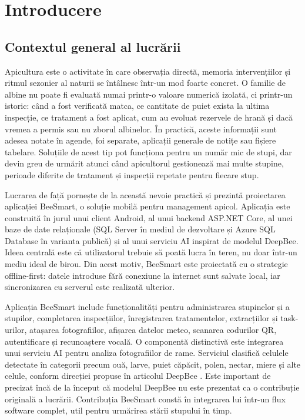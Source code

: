 \chapter{Introducere}
\label{chap:introducere}

\section{Contextul general al lucrării}

Apicultura este o activitate în care observația directă, memoria intervențiilor și ritmul sezonier al naturii se întâlnesc într-un mod foarte concret. O familie de albine nu poate fi evaluată numai printr-o valoare numerică izolată, ci printr-un istoric: când a fost verificată matca, ce cantitate de puiet exista la ultima inspecție, ce tratament a fost aplicat, cum au evoluat rezervele de hrană și dacă vremea a permis sau nu zborul albinelor. În practică, aceste informații sunt adesea notate în agende, foi separate, aplicații generale de notițe sau fișiere tabelare. Soluțiile de acest tip pot funcționa pentru un număr mic de stupi, dar devin greu de urmărit atunci când apicultorul gestionează mai multe stupine, perioade diferite de tratament și inspecții repetate pentru fiecare stup.

Lucrarea de față pornește de la această nevoie practică și prezintă proiectarea aplicației BeeSmart, o soluție mobilă pentru management apicol. Aplicația este construită în jurul unui client Android, al unui backend ASP.NET Core, al unei baze de date relaționale (SQL Server în mediul de dezvoltare și Azure SQL Database în varianta publică) și al unui serviciu AI inspirat de modelul DeepBee. Ideea centrală este că utilizatorul trebuie să poată lucra în teren, nu doar într-un mediu ideal de birou. Din acest motiv, BeeSmart este proiectată cu o strategie offline-first: datele introduse fără conexiune la internet sunt salvate local, iar sincronizarea cu serverul este realizată ulterior.

Aplicația BeeSmart include funcționalități pentru administrarea stupinelor și a stupilor, completarea inspecțiilor, înregistrarea tratamentelor, extracțiilor și task-urilor, atașarea fotografiilor, afișarea datelor meteo, scanarea codurilor QR, autentificare și recunoaștere vocală. O componentă distinctivă este integrarea unui serviciu AI pentru analiza fotografiilor de rame. Serviciul clasifică celulele detectate în categorii precum ouă, larve, puiet căpăcit, polen, nectar, miere și alte celule, conform direcției propuse în articolul DeepBee \cite{deepbeeArticle}. Este important de precizat încă de la început că modelul DeepBee nu este prezentat ca o contribuție originală a lucrării. Contribuția BeeSmart constă în integrarea lui într-un flux software complet, util pentru urmărirea stării stupului în timp.


